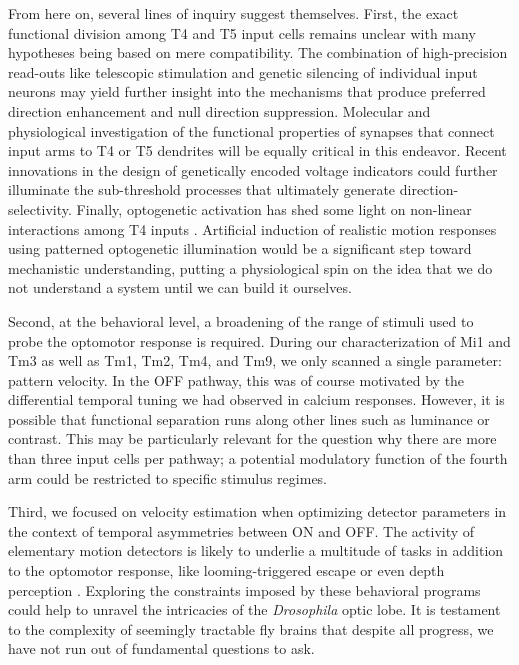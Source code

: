 From here on, several lines of inquiry suggest themselves. First, the exact functional division among T4 and T5 input cells remains unclear with many hypotheses being based on mere compatibility. The combination of high-precision read-outs like telescopic stimulation and genetic silencing of individual input neurons may yield further insight into the mechanisms that produce preferred direction enhancement and null direction suppression. Molecular and physiological investigation of the functional properties of synapses that connect input arms to T4 or T5 dendrites will be equally critical in this endeavor. Recent innovations in the design of genetically encoded voltage indicators could further illuminate the sub-threshold processes that ultimately generate direction-selectivity. Finally, optogenetic activation has shed some light on non-linear interactions among T4 inputs \citep{Strother:2017aa}. Artificial induction of realistic motion responses using patterned optogenetic illumination would be a significant step toward mechanistic understanding, putting a physiological spin on the idea that we do not understand a system until we can build it ourselves.

Second, at the behavioral level, a broadening of the range of stimuli used to probe the optomotor response is required. During our characterization of Mi1 and Tm3 as well as Tm1, Tm2, Tm4, and Tm9, we only scanned a single parameter: pattern velocity. In the OFF pathway, this was of course motivated by the differential temporal tuning we had observed in calcium responses. However, it is possible that functional separation runs along other lines such as luminance or contrast. This may be particularly relevant for the question why there are more than three input cells per pathway; a potential modulatory function of the fourth arm could be restricted to specific stimulus regimes.

Third, we focused on velocity estimation when optimizing detector parameters in the context of temporal asymmetries between ON and OFF. The activity of elementary motion detectors is likely to underlie a multitude of tasks in addition to the optomotor response, like looming-triggered escape or even depth perception \citep{Schilling:2015jh,Schwegmann:2014ir}. Exploring the constraints imposed by these behavioral programs could help to unravel the intricacies of the \textit{Drosophila} optic lobe. It is testament to the complexity of seemingly tractable fly brains that despite all progress, we have not run out of fundamental questions to ask.